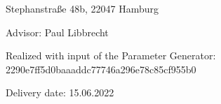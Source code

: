 \vspace*{-6mm}

\begin{large} 
\begin{center}
Stephanstraße 48b, 22047 Hamburg
\end{center}
\end{large} 

\vspace*{-6mm}


\vspace*{5mm}

\begin{large} 
\begin{center}
Advisor: Paul Libbrecht
\end{center}
\end{large} 

\begin{large} 
\begin{center}
Realized with input of the Parameter Generator: 2290e7ff5d0baaaddc77746a296e78c85cf955b0
\end{center}
\end{large} 



\vspace*{-6mm}

\begin{large} 
\begin{center}
Delivery date: 15.06.2022
\end{center}
\end{large} 


\pagestyle{empty} %

